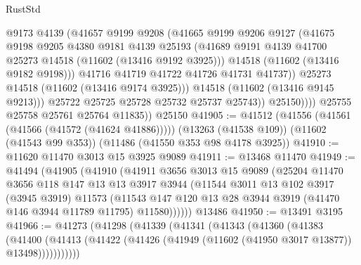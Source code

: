 \begin{lexlean}{RustStd}
\begin{coremodule}
                        @9173
                        @4139
                        (@41657
                          @9199
                          @9208
                          (@41665
                            @9199
                            @9206
                            @9127
                            (@41675
                              @9198
                              @9205
                              @4380
                              @9181
                              @4139
                              @25193
                              (@41689
                                @9191
                                @4139
                                @41700
                                @25273
                                @14518
                                (@11602 (@13416 @9192 @3925)))
                              @14518
                              (@11602 (@13416 @9182 @9198)))
                            @41716
                            @41719
                            @41722
                            @41726
                            @41731
                            @41737))
                        @25273
                        @14518
                        (@11602 (@13416 @9174 @3925)))
                      @14518
                      (@11602 (@13416 @9145 @9213)))
                    @25722
                    @25725
                    @25728
                    @25732
                    @25737
                    @25743))
                @25150))))
        @25755
        @25758
        @25761
        @25764
        @11835))
    @25150
@41905 := @41512
    (@41556 (@41561 (@41566 (@41572 (@41624 @41886)))))
    (@13263 (@41538 @109))
    (@11602 (@41543 @99 @353))
    (@11486 (@41550 @353 @98 @4178 @3925))
@41910 := @11620 @11470 @3013 @15 @3925 @9089
@41911 := @13468 @11470
@41949 := @41494
    (@41905
      (@41910
        (@41911
          @3656
          @3013
          @15
          @9089
          (@25204
            @11470
            @3656
            @118
            @147
            @13
            @13
            @3917
            @3944
            (@11544
              @3011
              @13
              @102
              @3917
              (@3945 @3919)
              @11573
              (@11543 @147 @120 @13 @28 @3944 @3919 (@41470 @146 @3944 @11789 @11795) @11580))))))
    @13486
@41950 := @13491 @3195
@41966 := @41273
    (@41298
      (@41339
        (@41341
          (@41343
            (@41360
              (@41383
                (@41400
                  (@41413 (@41422 (@41426 (@41949 (@11602 (@41950 @3017 @13877)) @13498)))))))))))

\end{coremodule}
\end{lexlean}
